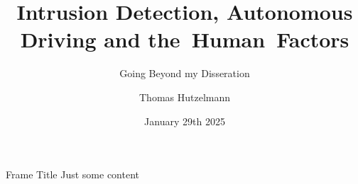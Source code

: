\documentclass[12pt,aspectratio=169]{beamer}
\author{Thomas Hutzelmann}
\title{Intrusion Detection, Autonomous Driving and the~Human~Factors}
\subtitle{Going Beyond my Disseration}
\date{January 29th 2025}
\begin{document}
\maketitle

\begin{frame}{Frame Title}
Just some content
\end{frame}
\end{document}
